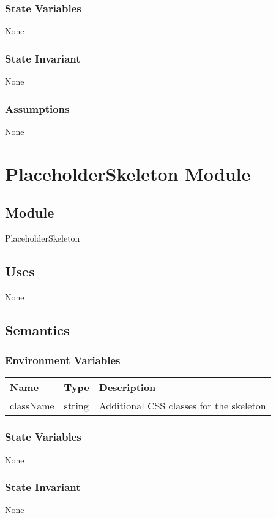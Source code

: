 \documentclass[12pt]{article}
\begin{document}
\subsubsection{State Variables}
None

\subsubsection{State Invariant}
None

\subsubsection{Assumptions}
None

\newpage


\section{PlaceholderSkeleton Module}

\subsection{Module}
PlaceholderSkeleton

\subsection{Uses}
None

\subsection{Semantics}

\subsubsection{Environment Variables}
\begin{tabular}{| l | l | p{10cm} |}
    \hline
    \textbf{Name} & \textbf{Type} & \textbf{Description}\\ \hline
    className & string & Additional CSS classes for the skeleton\\ \hline
\end{tabular}

\subsubsection{State Variables}
None

\subsubsection{State Invariant}
None
\end{document}
